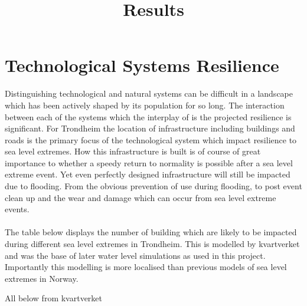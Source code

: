 
\title{Results}
\section{Technological Systems Resilience}

Distinguishing technological and natural systems can be difficult in a landscape which has been actively shaped by its population for so long. The interaction between each of the systems which the interplay of is the projected resilience is significant. For Trondheim the location of infrastructure including buildings and roads is the primary focus of the technological system which impact resilience to sea level extremes. How this infrastructure is built is of course of great importance to whether a speedy return to normality is possible after a sea level extreme event. Yet even perfectly designed infrastructure will still be impacted due to flooding. From the obvious  prevention of use during flooding, to post event clean up and the wear and damage which can occur from sea level extreme events.
\paragraph{}
The table below displays the number of building which are likely to be impacted during different sea level extremes in Trondheim. This is modelled by kvartverket and was the base of later water level simulations as used in this project. Importantly this modelling is more localised than previous models of sea level extremes in Norway. 

All below from kvartverket


